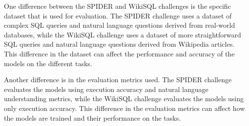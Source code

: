 One difference between the SPIDER and WikiSQL challenges is the specific dataset that is used for evaluation. The SPIDER challenge uses a dataset of complex SQL queries and natural language questions derived from real-world databases, while the WikiSQL challenge uses a dataset of more straightforward SQL queries and natural language questions derived from Wikipedia articles. This difference in the dataset can affect the performance and accuracy of the models on the different tasks.

Another difference is in the evaluation metrics used. The SPIDER challenge evaluates the models using execution accuracy and natural language understanding metrics, while the WikiSQL challenge evaluates the models using only execution accuracy. This difference in the evaluation metrics can affect how the models are trained and their performance on the tasks.